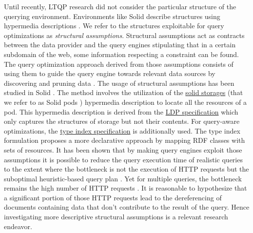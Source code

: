 Until recently, LTQP research did not consider the particular structure of the querying environment.
Environments like Solid describe structures using hypermedia descriptions \cite{Fielding}.
We refer to the structures exploitable for query optimizations as \emph{structural assumptions}.
Structural assumptions act as contracts between the data provider and 
the query engines stipulating that in a certain subdomain of the web, some information respecting a constraint can be found.
The query optimization approach derived from those assumptions consists of using them to guide the query engine towards relevant data sources 
by discovering and pruning data \cite{verborgh2020guided}.
The usage of structural assumptions has been studied in Solid \cite{Taelman2023}.
The method involves the utilization of the 
\href{https://solidproject.org/TR/protocol#resources}{solid storages} (that we refer to as Solid pods \cite{Taelman2023}) hypermedia description
to locate all the resources of a pod. 
This hypermedia description is derived from the \href{https://www.w3.org/TR/ldp/}{LDP specification}
which only captures the structures of storage but not their contents.
For query-aware optimizations, the \href{https://solid.github.io/type-indexes/}{type index specification} is additionally used.
The type index formulation proposes a more declarative approach \cite{Taelman2017} by mapping RDF classes with sets of resources.
It has been shown that by making query engines exploit those assumptions it is possible to reduce the query execution time
of realistic queries to the extent where the bottleneck is not the execution of 
HTTP requests but the suboptimal heuristic-based query plan \cite{eschauzier_quweda_2023, Taelman2023}.
Yet for multiple queries, the bottleneck remains the high number of HTTP requests  \cite{eschauzier_quweda_2023}.
It is reasonable to hypothesize that a significant portion of those HTTP requests lead to the dereferencing of
documents containing data that don't contribute to the result of the query.
Hence investigating more descriptive structural assumptions is a relevant research endeavor.

